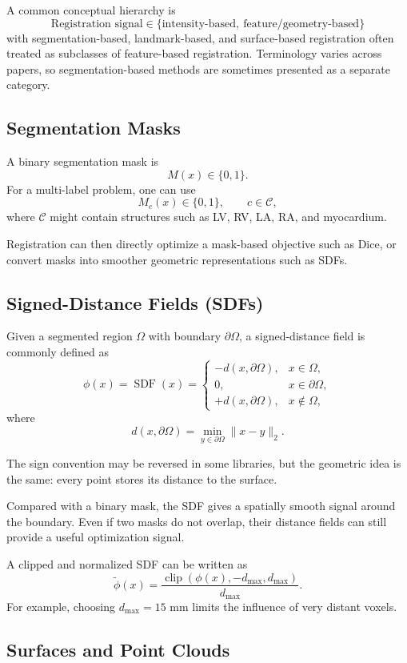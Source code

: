 \documentclass[11pt,a4paper]{article}
\newcommand{\sdf}{\operatorname{SDF}}
\begin{document}
A common conceptual hierarchy is
\[
\boxed{
\text{Registration signal}
\in
\{\text{intensity-based},\ \text{feature/geometry-based}\}
}
\]
with segmentation-based, landmark-based, and surface-based registration often treated as subclasses of feature-based registration. Terminology varies across papers, so segmentation-based methods are sometimes presented as a separate category.

\subsection{Segmentation Masks}

A binary segmentation mask is
\[
M(x)\in\{0,1\}.
\]
For a multi-label problem, one can use
\[
M_c(x)\in\{0,1\},
\qquad c\in\mathcal{C},
\]
where $\mathcal{C}$ might contain structures such as LV, RV, LA, RA, and myocardium.

Registration can then directly optimize a mask-based objective such as Dice, or convert masks into smoother geometric representations such as SDFs.

\subsection{Signed-Distance Fields (SDFs)}

Given a segmented region $\Omega$ with boundary $\partial\Omega$, a signed-distance field is commonly defined as
\[
\phi(x)=\sdf(x)=
\begin{cases}
-d(x,\partial\Omega), & x\in\Omega,\\
0, & x\in\partial\Omega,\\
+d(x,\partial\Omega), & x\notin\Omega,
\end{cases}
\]
where
\[
d(x,\partial\Omega)=\min_{y\in\partial\Omega}\|x-y\|_2.
\]

The sign convention may be reversed in some libraries, but the geometric idea is the same: every point stores its distance to the surface.

Compared with a binary mask, the SDF gives a spatially smooth signal around the boundary. Even if two masks do not overlap, their distance fields can still provide a useful optimization signal.

A clipped and normalized SDF can be written as
\[
\tilde\phi(x)
=
\frac{\operatorname{clip}(\phi(x),-d_{\max},d_{\max})}{d_{\max}}.
\]
For example, choosing $d_{\max}=15$ mm limits the influence of very distant voxels.

\subsection{Surfaces and Point Clouds}
\end{document}
